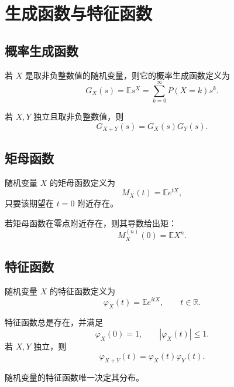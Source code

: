 \section{生成函数与特征函数}

\subsection{概率生成函数}

\begin{definition}[概率生成函数]
若 $X$ 是取非负整数值的随机变量，则它的概率生成函数定义为
\[
    G_X(s)=\mathbb{E}s^X=\sum_{k=0}^{\infty}P(X=k)s^k.
\]
\end{definition}

\begin{proposition}
若 $X,Y$ 独立且取非负整数值，则
\[
    G_{X+Y}(s)=G_X(s)G_Y(s).
\]
\end{proposition}

\subsection{矩母函数}

\begin{definition}[矩母函数]
随机变量 $X$ 的矩母函数定义为
\[
    M_X(t)=\mathbb{E}e^{tX},
\]
只要该期望在 $t=0$ 附近存在。
\end{definition}

\begin{remark}
若矩母函数在零点附近存在，则其导数给出矩：
\[
    M_X^{(n)}(0)=\mathbb{E}X^n.
\]
\end{remark}

\subsection{特征函数}

\begin{definition}[特征函数]
随机变量 $X$ 的特征函数定义为
\[
    \varphi_X(t)=\mathbb{E}e^{itX},
    \qquad t\in\mathbb{R}.
\]
\end{definition}

\begin{proposition}[基本性质]
特征函数总是存在，并满足
\[
    \varphi_X(0)=1,
    \qquad
    |\varphi_X(t)|\le1.
\]
若 $X,Y$ 独立，则
\[
    \varphi_{X+Y}(t)=\varphi_X(t)\varphi_Y(t).
\]
\end{proposition}

\begin{theorem}[唯一性定理]
随机变量的特征函数唯一决定其分布。
\end{theorem}

